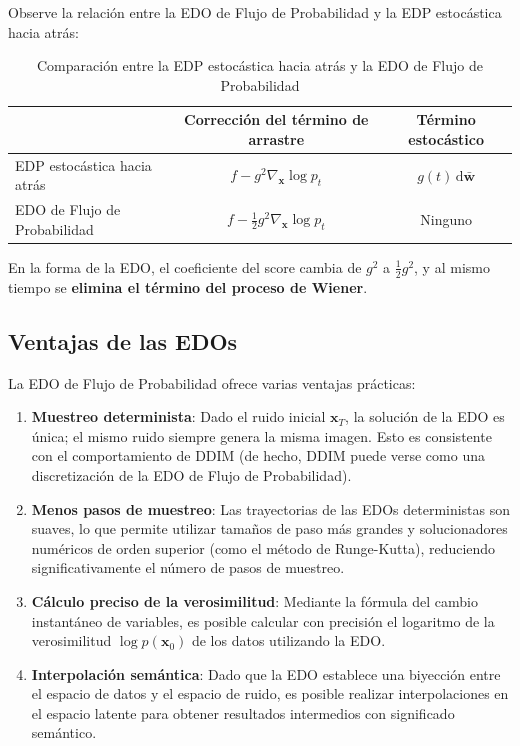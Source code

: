 \documentclass[a4paper]{article}
\begin{document}
Observe la relación entre la EDO de Flujo de Probabilidad y la EDP estocástica hacia atrás:

\begin{table}[H]
\centering
\begin{tabular}{lcc}
\toprule
& \textbf{Corrección del término de arrastre} & \textbf{Término estocástico} \\
\midrule
EDP estocástica hacia atrás & $f - g^2 \nabla_{\mathbf{x}} \log p_t$ & $g(t)\,\mathrm{d}\bar{\mathbf{w}}$ \\
EDO de Flujo de Probabilidad & $f - \frac{1}{2} g^2 \nabla_{\mathbf{x}} \log p_t$ & Ninguno \\
\bottomrule
\end{tabular}
\caption{Comparación entre la EDP estocástica hacia atrás y la EDO de Flujo de Probabilidad}
\end{table}

En la forma de la EDO, el coeficiente del score cambia de $g^2$ a $\frac{1}{2}g^2$, y al mismo tiempo se \textbf{elimina el término del proceso de Wiener}.

\subsection{Ventajas de las EDOs}

La EDO de Flujo de Probabilidad ofrece varias ventajas prácticas:

\begin{enumerate}
    \item \textbf{Muestreo determinista}: Dado el ruido inicial $\mathbf{x}_T$, la solución de la EDO es única; el mismo ruido siempre genera la misma imagen. Esto es consistente con el comportamiento de DDIM (de hecho, DDIM puede verse como una discretización de la EDO de Flujo de Probabilidad).
    \item \textbf{Menos pasos de muestreo}: Las trayectorias de las EDOs deterministas son suaves, lo que permite utilizar tamaños de paso más grandes y solucionadores numéricos de orden superior (como el método de Runge-Kutta), reduciendo significativamente el número de pasos de muestreo.
    \item \textbf{Cálculo preciso de la verosimilitud}: Mediante la fórmula del cambio instantáneo de variables, es posible calcular con precisión el logaritmo de la verosimilitud $\log p(\mathbf{x}_0)$ de los datos utilizando la EDO.
    \item \textbf{Interpolación semántica}: Dado que la EDO establece una biyección entre el espacio de datos y el espacio de ruido, es posible realizar interpolaciones en el espacio latente para obtener resultados intermedios con significado semántico.
\end{enumerate}
\end{document}
